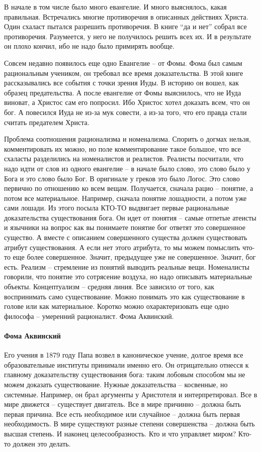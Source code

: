 \documentclass[a4paper, 12pt]{article}
\begin{document}
В начале в том числе было много евангелие. И много выяснялось, какая правильная. Встречались многие противоречия в описанных действиях Христа. Один схаласт пытался разрешить противоречия. В книге ``да и нет'' собрал все противоречия. Разумеется, у него не получилось решить всех их. И в результате он плохо кончил, ибо не надо было примирять вообще. 

Совсем недавно появилось еще одно Евангелие -- от Фомы. Фома был самым рациональным учеником, он требовал все время доказательства. В этой книге рассказывались все события с точки зрения Иуды. В историю он вошел, как образец предательства. А после евангелие от Фомы выяснилось, что не Иуда виноват, а Христос сам его попросил. Ибо Христос хотел доказать всем, что он бог. А повесился Иуда не из-за мук совести, а из-за того, что его правда стали считать предателем Христа. 

Проблема соотношения рационализма и номенализма. Спорить о догмах нельзя, комментировать их можно, но поле комментирование такое большое, что все схаласты разделились на номеналистов и реалистов. Реалисты посчитали, что надо идти от слов из одного евангелие -- в начале было слово, это слово было у Бога и это слово было Бог. В оригинале у греков это было Логос. Это слово первично по отношению ко всем вещам. Получается, сначала рацио -- понятие, а потом все материальное. Например, сначала понятие лошадности, а потом уже сами лошади. Из этого посыла КТО-ТО выдвигает первые рациональные доказательства существования бога. Он идет от понятия -- самые отпетые атеисты и язычники на вопрос как вы понимаете понятие бог ответят это совершенное существо. А вместе с описанием совершенного существа должен существовать атрибут существования. А если нет этого атрибута, то мы можем помыслить что-то еще более совершенное. Значит, предыдущее уже не совершенное. Значит, бог есть. Реализм -- стремление из понятий выводить реальные вещи. Номеналисты говорили, что понятие это сотрясение воздуха, но надо описывать материальные объекты. Концептуализм -- средняя линия. Все зависило от того, как воспринимать само существование. Можно понимать это как существование в голове или как материальное. Коротко можно охарактеризовать еще одно философа -- умеренний рационалист. Фома Аквинский. 

\paragraph{Фома Аквинский}Его учения в 1879 году Папа возвел в каноническое учение, долгое время все образовательные институты принимали именно его. Он отрицательно отнесся к главному доказательству существования бога: таким лобовым способом мы не можем доказать существование. Нужные доказательства -- косвенные, но системные. Например, он брал аргументы у Аристотеля и интерпретировал. Все в мире движется -- существует двигатель. Все в мире причинно -- должна быть первая причина. Все есть необходимое или случайное -- должна быть первая необходимость. В мире существуют разные степени совершенства -- должна быть высшая степень. И наконец целесообразность. Кто и что управляет миром? Кто-то должен это делать. 
\end{document}

